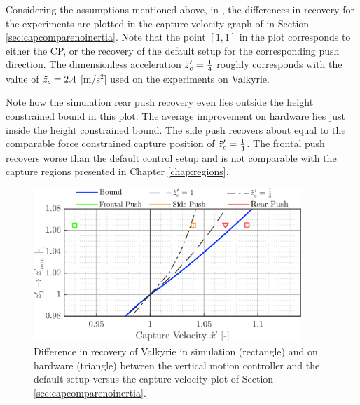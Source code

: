Considering the assumptions mentioned above, in , the differences in recovery for the experiments are plotted in the capture velocity graph of  in Section \ref{sec:capcomparenoinertia}. Note that the point $[1,1]$ in the plot corresponds to either the \ac{CP}, or the recovery of the default setup for the corresponding push direction. The dimensionless acceleration $\ddot{z}_{c}'=\frac{1}{4}$ roughly corresponds with the value of $\ddot{z}_{c}=2.4$ [m/s$^2$] used on the experiments on Valkyrie. 

Note how the simulation rear push recovery even lies outside the height constrained bound in this plot. The average improvement on hardware lies just inside the height constrained bound. The side push recovers about equal to the comparable force constrained capture position of $\ddot{z}_{c}'=\frac{1}{4}$. The frontal push recovers worse than the default control setup and is not comparable with the capture regions presented in Chapter \ref{chap:regions}.
\begin{figure}
\centering
\includegraphics[width=0.9\textwidth]{STYLESTUFF/regioncomparison.png}
\caption{Difference in recovery of Valkyrie in simulation (rectangle) and on hardware (triangle) between the vertical motion controller and the default setup versus the capture velocity plot of Section \ref{sec:capcomparenoinertia}.}
\label{fig:regioncomparison}
\end{figure}


